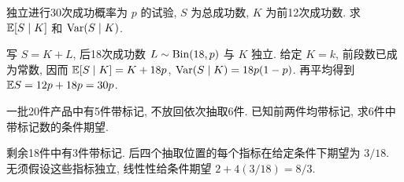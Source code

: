 \begin{example}
独立进行30次成功概率为 $p$ 的试验, $S$ 为总成功数, $K$ 为前12次成功数. 求 $\mathbb E[S\mid K]$ 和 $\operatorname{Var}(S\mid K)$.
\end{example}
\begin{solution}
写 $S=K+L$, 后18次成功数 $L\sim\operatorname{Bin}(18,p)$ 与 $K$ 独立. 给定 $K=k$, 前段数已成为常数, 因而 $\mathbb E[S\mid K]=K+18p$, $\operatorname{Var}(S\mid K)=18p(1-p)$. 再平均得到 $\mathbb E S=12p+18p=30p$.
\end{solution}
\begin{example}
一批20件产品中有5件带标记, 不放回依次抽取6件. 已知前两件均带标记, 求6件中带标记数的条件期望.
\end{example}
\begin{solution}
剩余18件中有3件带标记. 后四个抽取位置的每个指标在给定条件下期望为 $3/18$. 无须假设这些指标独立, 线性性给条件期望 $2+4(3/18)=8/3$.
\end{solution}

